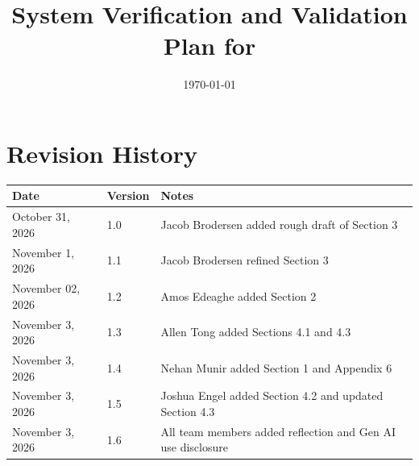 \documentclass[12pt, titlepage]{article}
\renewcommand{\wss}[1]{}
\begin{document}
\title{System Verification and Validation Plan for \progname{}} 
\author{\authname}
\date{\today}
	
\maketitle


\section*{Revision History}

\begin{tabularx}{\textwidth}{p{3cm}p{2cm}X}
\toprule {\bf Date} & {\bf Version} & {\bf Notes}\\
\midrule
October 31, 2026 & 1.0 & Jacob Brodersen added rough draft of Section 3 \\
November 1, 2026 & 1.1 & Jacob Brodersen refined Section 3 \\
November 02, 2026 & 1.2 & Amos Edeaghe added Section 2 \\
November 3, 2026 & 1.3 & Allen Tong added Sections 4.1 and 4.3 \\
November 3, 2026 & 1.4 & Nehan Munir added Section 1 and Appendix 6 \\
November 3, 2026 & 1.5 & Joshua Engel added Section 4.2 and updated Section 4.3 \\
November 3, 2026 & 1.6 & All team members added reflection and Gen AI use disclosure \\
\bottomrule
\end{tabularx}

~\\
\wss{The intention of the VnV plan is to increase confidence in the software.
However, this does not mean listing every verification and validation technique
that has ever been devised.  The VnV plan should also be a \textbf{feasible}
plan. Execution of the plan should be possible with the time and team available.
If the full plan cannot be completed during the time available, it can either be
modified to ``fake it'', or a better solution is to add a section describing
what work has been completed and what work is still planned for the future.}

\wss{The VnV plan is typically started after the requirements stage, but before
the design stage.  This means that the sections related to unit testing cannot
initially be completed.  The sections will be filled in after the design stage
is complete.  the final version of the VnV plan should have all sections filled
in.}
\end{document}
